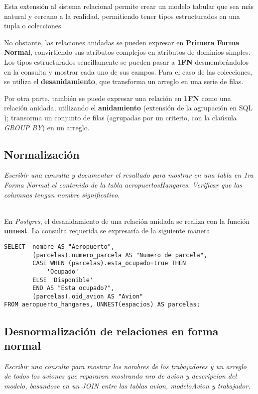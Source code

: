 Esta extensión al sistema relacional permite crear un modelo tabular que sea más natural y cercano a la realidad, permitiendo tener tipos estructurados en una tupla o colecciones.

No obstante, las relaciones anidadas se pueden expresar en \textbf{Primera Forma Normal}, convirtiendo sus atributos complejos en atributos de dominios simples. Los tipos estructurados sencillamente se pueden pasar a \textbf{1FN} desmembrándolos en la consulta y mostrar cada uno de sus campos. Para el caso de las colecciones, se utiliza el \textbf{desanidamiento}, que transforma un arreglo en una serie de filas.

Por otra parte, también se puede expresar una relación en \textbf{1FN} como una relación anidada, utilizando el \textbf{anidamiento} (extensión de la agrupación en SQL \cite{silberschatz}); transorma un conjunto de filas (agrupadas por un criterio, con la claúsula \emph{GROUP BY}) en un arreglo.

\subsection{Normalización}
\emph{Escribir una consulta y documentar el resultado para mostrar en una tabla en 1ra Forma Normal el contenido de la tabla aeropuertosHangares. Verificar que las columnas tengan nombre significativo.} 

~\\

En \emph{Postgres}, el desanidamiento de una relación anidada se realiza con la función \textbf{unnest}. La consulta requerida se expresaría de la siguiente manera  

\vspace*{5mm}
\lstset{style=sql}
\begin{lstlisting}
SELECT  nombre AS "Aeropuerto", 
        (parcelas).numero_parcela AS "Numero de parcela", 
        CASE WHEN (parcelas).esta_ocupado=true THEN 
            'Ocupado' 
        ELSE 'Disponible' 
        END AS "Esta ocupado?", 
        (parcelas).oid_avion AS "Avion" 
FROM aeropuerto_hangares, UNNEST(espacios) AS parcelas;
\end{lstlisting}

\subsection{Desnormalización de relaciones en forma normal}
\emph{Escribir una consulta para mostrar los nombres de los trabajadores y un arreglo de todos los aviones que repararon mostrando nro de avion y descripcion del modelo, basandose en un JOIN entre las tablas avion, modeloAvion y trabajador.} 

